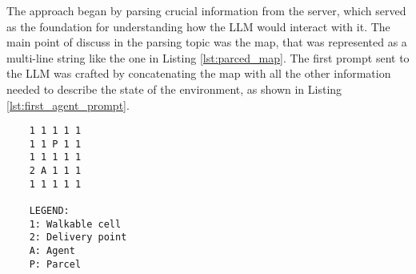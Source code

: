 The approach began by parsing crucial information from the server, which served
as the foundation for understanding how the LLM would interact with it. The main
point of discuss in the parsing topic was the map, that was represented as a
multi-line string like the one in Listing \ref{lst:parced_map}. The first prompt
sent to the LLM was crafted by concatenating the map with all the other information
needed to describe the state of the environment, as shown in Listing
\ref{lst:first_agent_prompt}.

\vspace{1mm}
\begin{codewindow}
  [Text]  \begin{lstlisting}
    1 1 1 1 1
    1 1 P 1 1
    1 1 1 1 1
    2 A 1 1 1
    1 1 1 1 1

    LEGEND:
    1: Walkable cell
    2: Delivery point
    A: Agent
    P: Parcel
\end{lstlisting}
\end{codewindow}
\vspace{1mm}

